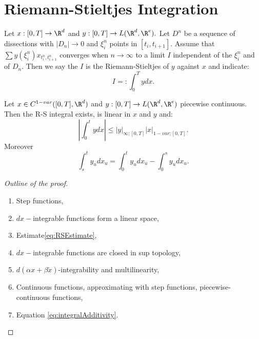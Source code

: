 \section{Riemann-Stieltjes Integration}

\begin{definition}
    Let $x:[0,T] \rightarrow \R^d$ and $y:[0,T] \rightarrow L(\R^d, \R^e).$ Let $D^n$ be a sequence of dissections with $|D_n| \rightarrow 0$ and $\xi^n_i$ points in $[t_i, t_{i+1}].$ Assume that $\sum y(\xi^n_i) x_{t^n_i, t^n_{i+1}}$ converges when $n \rightarrow \infty$ to a limit $I$ independent of the $\xi^n_i$ and of $D_n.$ Then we say the $I$ is the Riemann-Stieltjes of $y$ against $x$ and indicate:
    \begin{equation}
        I =: \int_0^T y dx.
    \end{equation}
\end{definition}

\begin{prop}
    Let $x \in C^{1-var}([0,T],\R^d)$ and $y:[0,T] \rightarrow L(\R^d, \R^e)$ piecewise continuous. Then the R-S integral exists, is linear in $x$ and $y$ and:
    \begin{equation}\label{eq:RSEstimate}
        \left| \int_0^t y dx \right| \leq |y|_{\infty;[0,T]} |x|_{1-var; [0,T]}.
    \end{equation}
    Moreover
    \begin{equation}\label{eq:integralAdditivity}
        \int_s^t y_u dx_u = \int_0^t y_u dx_u - \int_0^s y_u dx_u.
    \end{equation}
\end{prop}
\begin{proof}[Outline of the proof]
    \begin{enumerate}
        \item Step functions,
        \item $dx-$integrable functions form a linear space,
        \item Estimate\ref{eq:RSEstimate},
        \item $dx-$integrable functions are closed in sup topology,
        \item $d(\alpha x + \beta \tilde{x})$-integrability and multilinearity,
        \item Continuous functions, approximating with step functions, piecewise-continuous functions,
        \item Equation \ref{eq:integralAdditivity}.
    \end{enumerate}
\end{proof}


